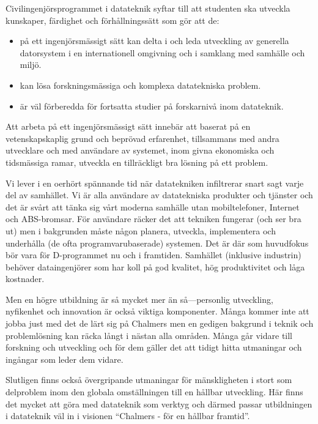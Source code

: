 \documentclass[twocolumn]{article}
\begin{document}
Civilingenjörsprogrammet i datateknik syftar till att studenten ska
utveckla kunskaper, färdighet och förhållningssätt som gör att de:
\begin{itemize}
\item på ett ingenjörsmässigt sätt kan delta i och leda utveckling av
  generella datorsystem i en internationell omgivning och i samklang
  med samhälle och miljö.
\item kan lösa forskningsmässiga och komplexa datatekniska problem.
\item är väl förberedda för fortsatta studier på forskarnivå inom
  datateknik.
\end{itemize}
Att arbeta på ett ingenjörsmässigt sätt innebär att
baserat på en vetenskapskaplig grund och beprövad erfarenhet,
tillsammans med andra utvecklare och med användare av systemet,
inom givna ekonomiska och tidsmässiga ramar,
utveckla en tillräckligt bra lösning på ett problem.

Vi lever i en oerhört spännande tid när datatekniken infiltrerar
snart sagt varje del av samhället.
%
Vi är alla användare av datatekniska produkter och tjänster och det
är svårt att tänka sig vårt moderna samhälle utan mobiltelefoner,
Internet och ABS-bromsar.
%
För användare räcker det att tekniken fungerar (och ser bra ut) men i
bakgrunden måste någon planera, utveckla, implementera och underhålla
(de ofta programvarubaserade) systemen.
%
Det är där som huvudfokus bör vara för D-programmet nu och i framtiden.
%
Samhället (inklusive industrin) behöver dataingenjörer som har koll på
god kvalitet, hög produktivitet och låga kostnader.
%

Men en högre utbildning är så mycket mer än så---personlig utveckling,
nyfikenhet och innovation är också viktiga komponenter.
%
Många kommer inte att jobba just med det de lärt sig på Chalmers men
en gedigen bakgrund i teknik och problemlösning kan räcka långt i
nästan alla områden.
%
Många går vidare till forskning och utveckling och för dem gäller det
att tidigt hitta utmaningar och ingångar som leder dem vidare.

Slutligen finns också övergripande utmaningar för mänskligheten i stort
som delproblem inom den globala omställningen till en hållbar
utveckling.
%
Här finns det mycket att göra med datateknik som verktyg och därmed
passar utbildningen i datateknik väl in i visionen ``Chalmers - för en
hållbar framtid''.
\end{document}

